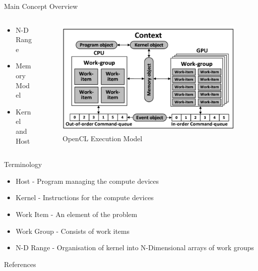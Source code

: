 \documentclass[10pt,aspectratio=169]{beamer} %
\begin{document}
\begin{frame}{Main Concept Overview}
\begin{columns}[c]
\begin{column}{0.35\textwidth}
\begin{itemize}
\item N-D Range
\item Memory Model
\item Kernel and Host
\end{itemize}
\end{column}%
\begin{column}{0.65\textwidth}
\begin{figure}
    \includegraphics[width=\textwidth]{OpenCLOverall.png}
    \caption{OpenCL Execution Model \textsuperscript{ \cite{Stone2010}}}
\end{figure}
\end{column}
\end{columns}
\end{frame}

\begin{frame}{Terminology}

\begin{itemize}
\item Host - Program managing the compute devices
\item Kernel - Instructions for the compute devices
\item Work Item - An element of the problem
\item Work Group - Consists of work items
\item N-D Range - Organisation of kernel into N-Dimensional arrays of work groups
\end{itemize}
\end{frame}

\begin{frame}[allowframebreaks]{References}

  
  

\end{frame}

\end{document}
